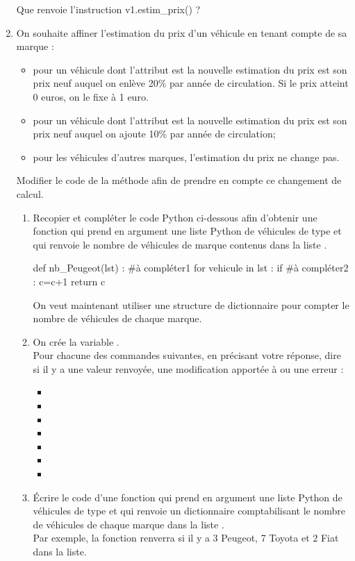 \documentclass[11pt,a4paper,french,twoside]{PMCours}
\begin{document}
\begin{enumerate}
Que renvoie l'instruction v1.estim\_prix() ? 
\item On souhaite affiner l'estimation du prix d'un véhicule en tenant compte de sa marque :
\begin{itemize}
\item pour un véhicule dont l'attribut  est  la nouvelle estimation du prix est son prix neuf auquel on enlève 20$\%$ par année de circulation. Si le prix atteint $0$ euros, on le fixe à 1 euro. 
\item pour un véhicule dont l'attribut  est  la nouvelle estimation du prix est son prix neuf auquel on ajoute 10$\%$ par année de circulation; 
\item pour les véhicules d'autres marques, l'estimation du prix ne change pas.
\end{itemize}
Modifier le code de la méthode  afin de prendre en compte ce changement
de calcul.
\begin{enumerate} 
\item Recopier et compléter le code Python ci-dessous afin d'obtenir une fonction  qui prend en argument une liste Python de véhicules de type  et qui renvoie le nombre de véhicules de marque  contenus dans la liste .
\begin{Python}
def nb_Peugeot(lst) : 
	#à compléter1
	for vehicule in lst : 
		if #à compléter2 :
			c=c+1
	return c
\end{Python}
On veut maintenant utiliser une structure de dictionnaire pour compter le nombre de véhicules de chaque marque.
\item On crée la variable .\\
Pour chacune des commandes suivantes, en précisant votre réponse, dire si il y a une valeur renvoyée, une modification apportée à  ou une erreur : 
\begin{itemize} 
\item {}
\item {}
\item {}
\item {}
\item {}
\item {}
\item {}
\end{itemize} 
\item Écrire le code d'une fonction  qui prend en argument une liste Python de véhicules de type  et qui renvoie un dictionnaire comptabilisant le nombre de véhicules de chaque marque dans la liste .\\
Par exemple, la fonction renverra  si il y a 3 Peugeot, 7 Toyota et 2 Fiat dans la liste.
\end{enumerate}    


\end{enumerate}
\end{document}
